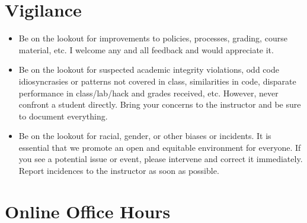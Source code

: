 \documentclass[12pt]{scrartcl}
\begin{document}
\section*{Vigilance}

\begin{itemize}
  \item Be on the lookout for improvements to policies, processes, 
    grading, course material, etc.  I welcome any and all feedback and would
    appreciate it.
  \item Be on the lookout for suspected academic integrity violations, odd
    code idiosyncrasies or patterns not covered in class, similarities in code, 
    disparate performance in class/lab/hack and grades received, etc.  However,
    never confront a student directly.  Bring your concerns to the instructor and
    be sure to document everything.
  \item Be on the lookout for racial, gender, or other biases or incidents.  
    It is essential that we promote an open and equitable environment for everyone.
    If you see a potential issue or event, please intervene and correct it immediately.
    Report incidences to the instructor as soon as possible.  
\end{itemize}

\section*{Online Office Hours}
\end{document}

